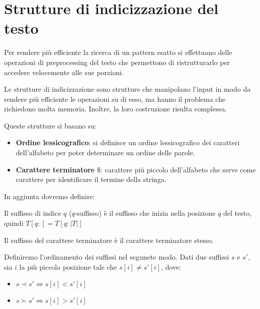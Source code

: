 \section{Strutture di indicizzazione del testo}
Per rendere più efficiente la ricerca di un pattern esatto si effettuano delle
operazioni di preprocessing del testo che permettono di ristrutturarlo per accedere
velocemente alle sue porzioni.

Le strutture di indicizzazione sono strutture che manipolano l'input in modo da
rendere più efficiente le operazioni su di esso, ma hanno il problema che richiedono
molta memoria. Inoltre, la loro costruzione risulta complessa.

Queste strutture si basano su:
\begin{itemize}
    \item \textbf{Ordine lessicografico}: si definisce un ordine lessicografico
          dei caratteri dell'alfabeto per poter determinare un ordine delle parole.
    \item \textbf{Carattere terminatore} $\$ $: carattere più piccolo dell'alfabeto che
          serve come carattere per identificare il termine della stringa.
\end{itemize}
In aggiunta dovremo definire:
\begin{definizione}
    Il suffisso di indice $q$ ($q$-suffisso) è il suffisso che inizia nella posizione
    $q$ del testo, quindi $T[q:]= T[q:|T|]$
\end{definizione}
Il suffisso del carattere terminatore è il carattere terminatore stesso.
\begin{definizione}
    Definiremo l'ordinamento dei suffissi nel segunete modo. Dati due suffissi $s$
    e $s'$, sia $i$ la più piccola posizione tale che $s[i]\ne s'[i]$, dove:
    \begin{itemize}
        \item $s \prec s'\iff s[i] < s'[i]$
        \item $s \succ s'\iff s[i] > s'[i]$
    \end{itemize}
\end{definizione}
